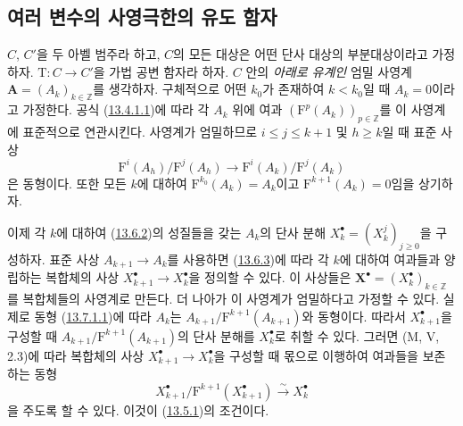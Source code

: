\subsection{여러 변수의 사영극한의 유도 함자}
\label{subsection:0.13.7-fr}

\begin{env}[13.7.1]
\label{0.13.7.1-fr}
$C$, $C'$을 두 아벨 범주라 하고, $C$의 모든 대상은 어떤 단사 대상의
부분대상이라고 가정하자. $\mathrm T:C\to C'$을 가법 공변 함자라 하자.
$C$ 안의 \emph{아래로 유계인} 엄밀 사영계
$\mathbf A=(A_k)_{k\in\mathbb Z}$를 생각하자. 구체적으로 어떤 $k_0$가
존재하여 $k<k_0$일 때 $A_k=0$이라고 가정한다. 공식
(\hyperref[0.13.4.1.1-fr]{13.4.1.1})에 따라 각 $A_k$ 위에 여과
$(\mathrm F^p(A_k))_{p\in\mathbb Z}$를 이 사영계에 표준적으로
연관시킨다. 사영계가 엄밀하므로 $i\leq j\leq k+1$ 및 $h\geq k$일 때
표준 사상
\begin{equation}
\label{0.13.7.1.1-fr}
\tag{13.7.1.1}
\mathrm F^i(A_h)/\mathrm F^j(A_h)\to
\mathrm F^i(A_k)/\mathrm F^j(A_k)
\end{equation}
은 동형이다. 또한 모든 $k$에 대하여
$\mathrm F^{k_0}(A_k)=A_k$이고 $\mathrm F^{k+1}(A_k)=0$임을 상기하자.
\end{env}

\begin{env}[13.7.2]
\label{0.13.7.2-fr}
이제 각 $k$에 대하여 (\hyperref[0.13.6.2-fr]{13.6.2})의 성질들을 갖는
$A_k$의 단사 분해 $X_k^\bullet=(X_k^j)_{j\geq0}$을 구성하자. 표준
사상 $A_{k+1}\to A_k$를 사용하면
(\hyperref[0.13.6.3-fr]{13.6.3})에 따라 각 $k$에 대하여 여과들과
양립하는 복합체의 사상 $X_{k+1}^\bullet\to X_k^\bullet$을 정의할 수
있다. 이 사상들은
$\mathbf X^\bullet=(X_k^\bullet)_{k\in\mathbb Z}$를 복합체들의
사영계로 만든다.
더 나아가 이 사영계가 엄밀하다고 가정할 수 있다. 실제로 동형
(\hyperref[0.13.7.1.1-fr]{13.7.1.1})에 따라 $A_k$는
$A_{k+1}/\mathrm F^{k+1}(A_{k+1})$와 동형이다. 따라서
$X_{k+1}^\bullet$을 구성할 때
$A_{k+1}/\mathrm F^{k+1}(A_{k+1})$의 단사 분해를
$X_k^\bullet$로 취할 수 있다. 그러면 (M, V, 2.3)에 따라 복합체의
사상 $X_{k+1}^\bullet\to X_k^\bullet$을 구성할 때 몫으로 이행하여
여과들을 보존하는 동형
\[
X_{k+1}^\bullet/\mathrm F^{k+1}(X_{k+1}^\bullet)
\xrightarrow{\sim}X_k^\bullet
\]
을 주도록 할 수 있다. 이것이
(\hyperref[0.13.5.1-fr]{13.5.1})의 조건이다.
\end{env}

